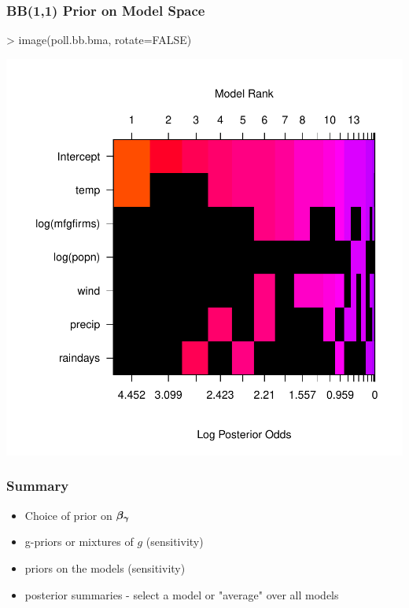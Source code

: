 \documentclass[]{beamer}
\begin{document}
\begin{frame}[fragile]\frametitle{BB(1,1) Prior on Model Space}


\begin{Schunk}
\begin{Sinput}
> image(poll.bb.bma, rotate=FALSE)
\end{Sinput}
\end{Schunk}
\includegraphics{17-bma-006}
\end{frame}


\begin{frame}\frametitle{Summary}

\begin{itemize}
  \item Choice of prior on $\boldsymbol{\beta_\gamma}$ 
  \item g-priors or mixtures of $g$ (sensitivity)
  \item priors on the models (sensitivity)
  \item posterior summaries - select a model or "average" over all models
\end{itemize}


\end{frame}
\end{document}

